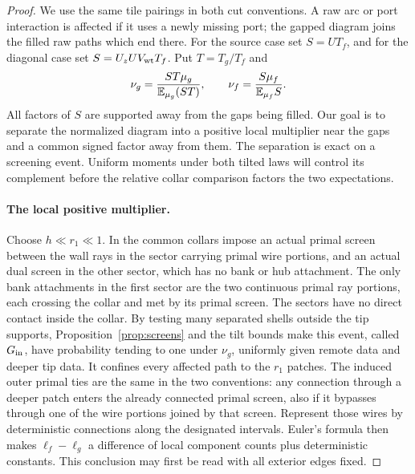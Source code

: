 \begin{proof}
We use the same tile pairings in both cut conventions.  A raw arc
or port interaction is affected if it uses a newly missing port;
the gapped diagram joins the filled raw paths which end there.
For the source case set $S=UT_f$, and for the diagonal case set
$S=U_zUV_{\rm wt}T_f$.  Put $T=T_g/T_f$ and
\begin{equation}
 \nu_g=\frac{ST\mu_g}{\mathbb E_{\mu_g}(ST)},\qquad
 \nu_f=\frac{S\mu_f}{\mathbb E_{\mu_f}S}.
 \label{obs:gap-tilted-laws}
\end{equation}
All factors of $S$ are supported away from the gaps being filled.
Our goal is to separate the normalized diagram into a positive local
multiplier near the gaps and a common signed factor away from them.
The separation is exact on a screening event.  Uniform moments under
both tilted laws will control its complement before the relative
collar comparison factors the two expectations.

\paragraph{The local positive multiplier.}
Choose $h\ll r_1\ll1$.  In the common collars impose an actual
primal screen between the wall rays in the sector carrying primal
wire portions, and an actual dual screen in the other sector,
which has no bank or hub attachment.  The only bank attachments in
the first sector are the two continuous primal ray portions, each
crossing the collar and met by its primal screen.  The sectors have
no direct contact inside the collar.  By testing many separated
shells outside the tip supports, Proposition~\ref{prop:screens}
and the tilt bounds make this event, called $G_{\rm in}$, have
probability tending to one under $\nu_g$, uniformly given remote
data and deeper tip data.  It confines every affected path to the
$r_1$ patches.  The induced outer primal ties are the same in the
two conventions: any connection through a deeper patch enters
the already connected primal screen, also if it bypasses through
one of the wire portions joined by that screen.  Represent those
wires by deterministic connections along the designated intervals.
Euler's formula then makes $\ell_f-\ell_g$ a difference of local
component counts plus deterministic constants.  This conclusion
may first be read with all exterior edges fixed.


\end{proof}
